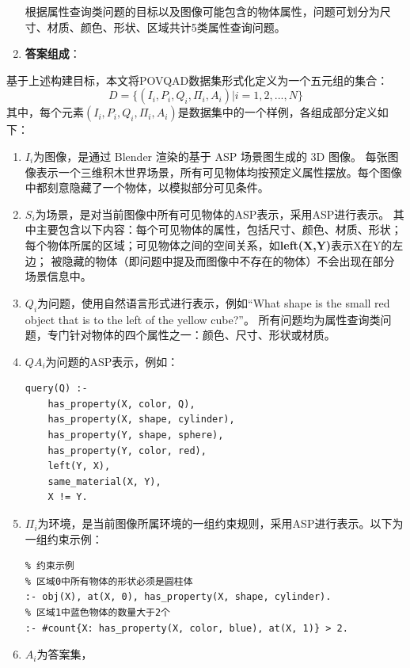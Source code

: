 \begin{enumerate}[itemsep=0pt,parsep=0pt]
根据属性查询类问题的目标以及图像可能包含的物体属性，问题可划分为尺寸、材质、颜色、形状、区域共计5类属性查询问题。
\item \textbf{答案组成}：
\end{enumerate}

基于上述构建目标，本文将POVQAD数据集形式化定义为一个五元组的集合：
$$D = \{ (I_i,P_i,Q_i,\Pi_i ,A_i) | i=1,2,...,N \}$$
其中，每个元素$(I_i,P_i,Q_i,\Pi_i ,A_i)$是数据集中的一个样例，各组成部分定义如下：
\begin{enumerate}[itemsep=0pt,parsep=0pt]
\item \textbf{$I_i$}为图像，是通过 Blender 渲染的基于 ASP 场景图生成的 3D 图像。
每张图像表示一个三维积木世界场景，所有可见物体均按预定义属性摆放。每个图像中都刻意隐藏了一个物体，以模拟部分可见条件。
\item \textbf{$S_i$}为场景，是对当前图像中所有可见物体的ASP表示，采用ASP进行表示。
其中主要包含以下内容：每个可见物体的属性，包括尺寸、颜色、材质、形状；每个物体所属的区域；可见物体之间的空间关系，如\textbf{left(X,Y)}表示X在Y的左边；
被隐藏的物体（即问题中提及而图像中不存在的物体）不会出现在部分场景信息中。
\item \textbf{$Q_i$}为问题，使用自然语言形式进行表示，例如“What shape is the small red object that is to the left of the yellow cube?”。
所有问题均为属性查询类问题，专门针对物体的四个属性之一：颜色、尺寸、形状或材质。
\item \textbf{$QA_i$}为问题的ASP表示，例如：
\begin{lstlisting}
query(Q) :-
    has_property(X, color, Q),
    has_property(X, shape, cylinder),
    has_property(Y, shape, sphere),
    has_property(Y, color, red),
    left(Y, X),
    same_material(X, Y),
    X != Y.
\end{lstlisting}
\item \textbf{$\Pi_i$}为环境，是当前图像所属环境的一组约束规则，采用ASP进行表示。以下为一组约束示例：
\begin{lstlisting}
% 约束示例
% 区域0中所有物体的形状必须是圆柱体
:- obj(X), at(X, 0), has_property(X, shape, cylinder).
% 区域1中蓝色物体的数量大于2个
:- #count{X: has_property(X, color, blue), at(X, 1)} > 2.
\end{lstlisting}
\item \textbf{$A_i$}为答案集，
\end{enumerate}

